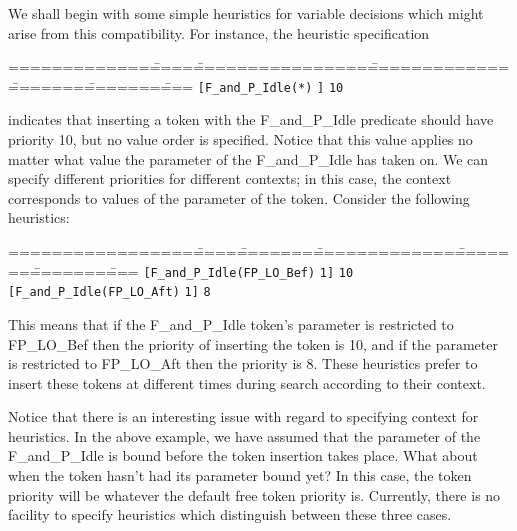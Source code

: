 We shall begin with some simple heuristics for variable decisions which might
arise from this compatibility.  For instance, the heuristic specification
\begin{tabbing}
=============\=====\=================\==============\========\========\====\kill
{\tt[F\_and\_P\_Idle(*)} \> {\tt ]} \> {\tt 10} \\
\end{tabbing}
indicates that inserting a token with the F\_and\_P\_Idle predicate should
have priority 10, but no value order is specified.  Notice that this value applies
no matter what value the parameter of the F\_and\_P\_Idle has taken on.  We
can specify different priorities for different contexts; in this case,
the context corresponds to values of the parameter of the token.  Consider
the following heuristics:
\begin{tabbing}
=================\=====\========\==============\========\========\====\kill
{\tt[F\_and\_P\_Idle(FP\_LO\_Bef)} \> {\tt 1]} \> {\tt 10} \\
{\tt[F\_and\_P\_Idle(FP\_LO\_Aft)} \> {\tt 1]} \> {\tt 8} \\
\end{tabbing}
This means that if the F\_and\_P\_Idle token's parameter is restricted
to FP\_LO\_Bef then the priority of inserting the token is 10, and if
the parameter is restricted to FP\_LO\_Aft then the priority is 8. 
These heuristics prefer to insert these tokens at different times
during search according to their context.

Notice that there is an interesting issue with regard to specifying
context for heuristics.  In the above example, we have assumed that
the parameter of the F\_and\_P\_Idle is bound before the token
insertion takes place.  What about when the token hasn't had its
parameter bound yet?  In this case, the token priority will be
whatever the default free token priority is.  Currently, there is no
facility to specify heuristics which distinguish between these 
three cases.

